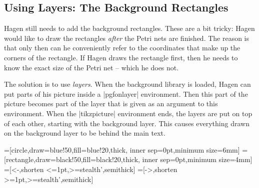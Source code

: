 \subsection{Using Layers: The Background Rectangles}

Hagen still needs to add the background rectangles. These are a bit
tricky: Hagen would like to draw the rectangles \emph{after} the Petri
nets are finished. The reason is that only then can he conveniently
refer to the coordinates that make up the corners of the
rectangle. If Hagen draws the rectangle first, then he needs to know
the exact size of the Petri net -- which he does not.

The solution is to use \emph{layers}. When the background library is
loaded, Hagen can put parts of his picture inside a |{pgfonlayer}|
environment. Then this part of the picture becomes part of the layer
that is given as an argument to this environment. When the
|{tikzpicture}| environment ends, the layers are put on top of each
other, starting with the background layer. This causes everything
drawn on the background layer to be behind the main text.


{
=[circle,draw=blue!50,fill=blue!20,thick,
                   inner sep=0pt,minimum size=6mm]
=[rectangle,draw=black!50,fill=black!20,thick,
                        inner sep=0pt,minimum size=4mm]
=[<-,shorten <=1pt,>=stealth',semithick]  
=[->,shorten >=1pt,>=stealth',semithick]  
\begin{codeexample}[]
\end{codeexample}
}




